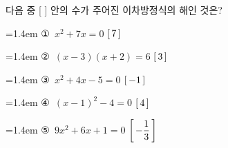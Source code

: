 다음 중 [ ] 안의 수가 주어진 이차방정식의 해인 것은?
\par\medskip\par\noindent\hangindent=1.4em {\small ①}\ $x^2+7x=0$ \quad $[\mkern3mu 7\mkern3mu ]$\par\noindent\hangindent=1.4em {\small ②}\ $(x-3)(x+2)=6$ \quad $[\mkern3mu 3\mkern3mu ]$\par\noindent\hangindent=1.4em {\small ③}\ $x^2+4x-5=0$ \quad $[\mkern3mu -1\mkern3mu ]$\par\noindent\hangindent=1.4em {\small ④}\ $(x-1)^2-4=0$ \quad $[\mkern3mu 4\mkern3mu ]$\par\noindent\hangindent=1.4em {\small ⑤}\ $9x^2+6x+1=0$ \quad $\left[\mkern3mu -\dfrac{1}{3}\mkern3mu \right]$\par\medskip
